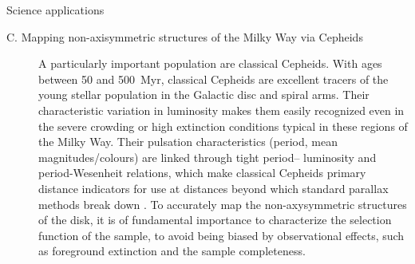 \begin{workpackage}{Science applications}
\begin{wpobjectives}
\begin{description}
     \item[C. Mapping non-axisymmetric structures of the Milky Way via Cepheids]
        {
        
        A particularly important population are classical Cepheids. With ages between 50 and 500~Myr, classical Cepheids are excellent tracers of the young stellar population in the Galactic disc and spiral arms. Their characteristic variation in luminosity makes them easily recognized even in the severe crowding or high extinction conditions typical in these regions of the Milky Way. Their pulsation characteristics (period, mean magnitudes/colours) are linked through tight period– luminosity and period-Wesenheit relations, which make classical Cepheids primary distance indicators for use at distances beyond which standard parallax methods break down \cite{Clementini2019, Inno2013}. To accurately map the non-axysymmetric structures of the disk, it is of fundamental importance to characterize the selection function of the sample, to avoid being biased by observational effects, such as foreground extinction and the sample completeness. 
        
}
\end{description}
\end{wpobjectives}
\end{workpackage}

